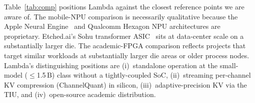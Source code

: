 \documentclass[conference]{IEEEtran}
\begin{document}
Table~\ref{tab:comp} positions Lambda against the closest reference points we are aware of. The mobile-NPU comparison is necessarily qualitative because the Apple Neural Engine~\cite{apple_foundation} and Qualcomm Hexagon NPU architectures are proprietary. Etched.ai's Sohu transformer ASIC~\cite{etched_sohu} sits at data-center scale on a substantially larger die. The academic-FPGA comparison reflects projects that target similar workloads at substantially larger die areas or older process nodes. Lambda's distinguishing positions are (i)~standalone operation at the small-model ($\leq$1.5\,B) class without a tightly-coupled SoC, (ii)~streaming per-channel KV compression (ChannelQuant) in silicon, (iii)~adaptive-precision KV via the TIU, and (iv)~open-source academic distribution.

\end{document}
